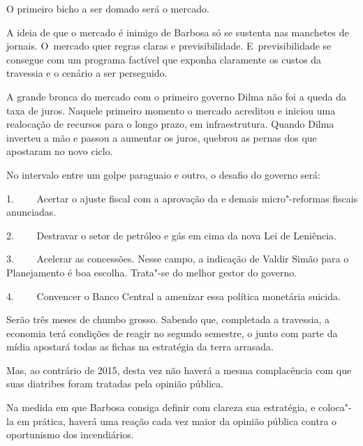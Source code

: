 O primeiro bicho a ser domado será o mercado.

A ideia de que o mercado é inimigo de Barbosa só se sustenta nas
manchetes de jornais. O~mercado quer regras claras e previsibilidade. E~previsibilidade se consegue com um programa factível que exponha
claramente os custos da travessia e o cenário a ser perseguido.

A grande bronca do mercado com o primeiro governo Dilma não foi a queda
da taxa de juros. Naquele primeiro momento o mercado acreditou e iniciou
uma realocação de recursos para o longo prazo, em infraestrutura. Quando
Dilma inverteu a mão e passou a aumentar os juros, quebrou as pernas dos
que apostaram no novo ciclo.

No intervalo entre um golpe paraguaio e outro, o desafio do governo
será:

1.~~~~ Acertar o ajuste fiscal com a aprovação da  e demais
micro"-reformas fiscais anunciadas.

2.~~~~ Destravar o setor de petróleo e gás em cima da nova Lei de
Leniência.

3.~~~~ Acelerar as concessões. Nesse campo, a indicação de Valdir Simão
para o Planejamento é boa escolha. Trata"-se do melhor gestor do governo.

4.~~~~ Convencer o Banco Central a amenizar essa política monetária
suicida.

 Serão três meses de chumbo grosso. Sabendo que, completada a travessia,
a economia terá condições de reagir no segundo semestre, o  junto
com parte da mídia apostará todas as fichas na estratégia da terra
arrasada.

Mas, ao contrário de 2015, desta vez não haverá a mesma complacência com
que suas diatribes foram tratadas pela opinião pública.

Na medida em que Barbosa consiga definir com clareza sua estratégia, e
coloca"-la em prática, haverá uma reação cada vez maior da opinião
pública contra o oportunismo dos incendiários.
